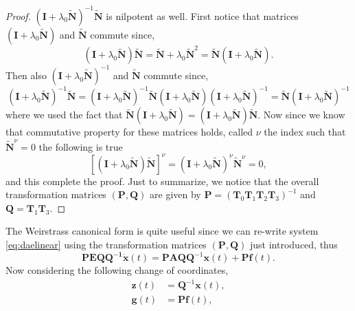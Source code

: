 \begin{proof}
			$(\bm{I}+\lambda_{0}\tilde{\bm{N}})^{-1}\tilde{\bm{N}}$
			is nilpotent as well.
			First notice that matrices $(\bm{I}+\lambda_{0}\tilde{\bm{N}})$
			and $\tilde{\bm{N}}$ commute since, 
			\begin{equation}
				(\bm{I}+\lambda_{0}\tilde{\bm{N}})\tilde{\bm{N}} 
				= \tilde{\bm{N}} + \lambda_{0}\tilde{\bm{N}}^{2} 
				= \tilde{\bm{N}}(\bm{I}+\lambda_{0}\tilde{\bm{N}}).
			\end{equation} 
			Then also $(\bm{I}+\lambda_{0}\tilde{\bm{N}})^{-1}$ 
			and $\tilde{\bm{N}}$ commute since, 
			\begin{equation}
				(\bm{I}+\lambda_{0}\tilde{\bm{N}})^{-1}\tilde{\bm{N}} 
				= (\bm{I}+\lambda_{0}\tilde{\bm{N}})^{-1}
				\tilde{\bm{N}}(\bm{I}+\lambda_{0}\tilde{\bm{N}})(\bm{I}+\lambda_{0}\tilde{\bm{N}})^{-1} 
				= \tilde{\bm{N}}(\bm{I}+\lambda_{0}\tilde{\bm{N}})^{-1}
			\end{equation}
			where we used the fact that 
			$\tilde{\bm{N}}(\bm{I}+\lambda_{0}\tilde{\bm{N}})=(\bm{I}+\lambda_{0}\tilde{\bm{N}})\tilde{\bm{N}}$.
			Now since we know that commutative property for these matrices holds, 
			called $\nu$ the index such that $\tilde{\bm{N}}^{\nu}=0$ the following is true
			\begin{equation}
				\left[(\bm{I}+\lambda_{0}\tilde{\bm{N}})\tilde{\bm{N}}\right]^{\nu}
				= (\bm{I}+\lambda_{0}\tilde{\bm{N}})^{\nu}\tilde{\bm{N}}^{\nu}=0,
			\end{equation}
			and this complete the proof.
			Just to summarize, we notice that the overall transformation matrices
			$(\bm{P},\bm{Q})$ are given by
			$\bm{P} = (\bm{T}_{0}\bm{T}_{1}\bm{T}_{2}\bm{T}_{3})^{-1}$ and $\bm{Q} = \bm{T}_{1}\bm{T}_{3}$.
		\end{proof}
		The Weirstrass canonical form is quite useful since we can re-write
		system \cref{eq:daelinear} using the transformation matrices
		$(\bm{P},\bm{Q})$ just introduced, thus
		\begin{equation}
		  \bm{PEQQ^{-1}}\dot{\bm{x}}(t) = \bm{PAQQ}^{-1}\bm{x}(t)+\bm{Pf}(t).
		\end{equation}
		Now considering the following change of coordinates,
		\begin{subequations}
			\begin{align}
				\label{eq:changeofcoordinates}
				\bm{z}(t) &= \bm{Q}^{-1}\bm{x}(t), \\
				\bm{g}(t) &= \bm{Pf}(t),
			\end{align}
		\end{subequations}
